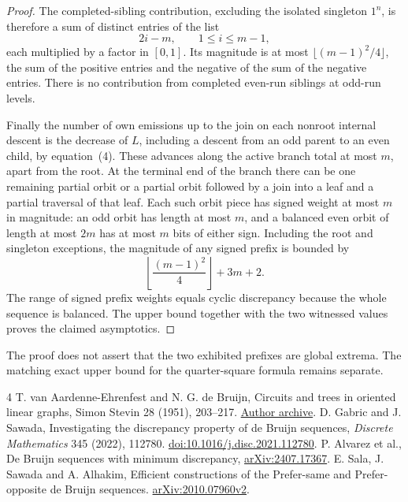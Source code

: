 \documentclass[11pt]{article}
\begin{document}
\begin{proof}
The completed-sibling contribution, excluding the isolated singleton \(1^n\), is therefore a sum of distinct entries of the list
\[
    2i-m,\qquad 1\le i\le m-1,
\]
each multiplied by a factor in \([0,1]\). Its magnitude is at most \(\lfloor(m-1)^2/4\rfloor\), the sum of the positive entries and the negative of the sum of the negative entries. There is no contribution from completed even-run siblings at odd-run levels.

Finally the number of own emissions up to the join on each nonroot internal descent is the decrease of \(L\), including a descent from an odd parent to an even child, by equation~(4). These advances along the active branch total at most \(m\), apart from the root. At the terminal end of the branch there can be one remaining partial orbit or a partial orbit followed by a join into a leaf and a partial traversal of that leaf. Each such orbit piece has signed weight at most \(m\) in magnitude: an odd orbit has length at most \(m\), and a balanced even orbit of length at most \(2m\) has at most \(m\) bits of either sign. Including the root and singleton exceptions, the magnitude of any signed prefix is bounded by
\[
    \left\lfloor\frac{(m-1)^2}{4}\right\rfloor+3m+2.
\]
The range of signed prefix weights equals cyclic discrepancy because the whole sequence is balanced. The upper bound together with the two witnessed values proves the claimed asymptotics.
\end{proof}

The proof does not assert that the two exhibited prefixes are global extrema. The matching exact upper bound for the quarter-square formula remains separate.

\begin{thebibliography}{4}
 T. van Aardenne-Ehrenfest and N. G. de Bruijn, Circuits and trees in oriented linear graphs, Simon Stevin 28 (1951), 203--217. \href{https://pure.tue.nl/ws/files/3311129/597493.pdf}{Author archive}.
 D. Gabric and J. Sawada,
Investigating the discrepancy property of de Bruijn sequences,
\emph{Discrete Mathematics} 345 (2022), 112780.
\href{https://doi.org/10.1016/j.disc.2021.112780}{doi:10.1016/j.disc.2021.112780}.
 P. Alvarez et al.,
De Bruijn sequences with minimum discrepancy,
\href{https://arxiv.org/abs/2407.17367}{arXiv:2407.17367}.
 E. Sala, J. Sawada and A. Alhakim, Efficient constructions
of the Prefer-same and Prefer-opposite de Bruijn sequences.
\href{https://arxiv.org/abs/2010.07960}{arXiv:2010.07960v2}.
\end{thebibliography}
\end{document}
